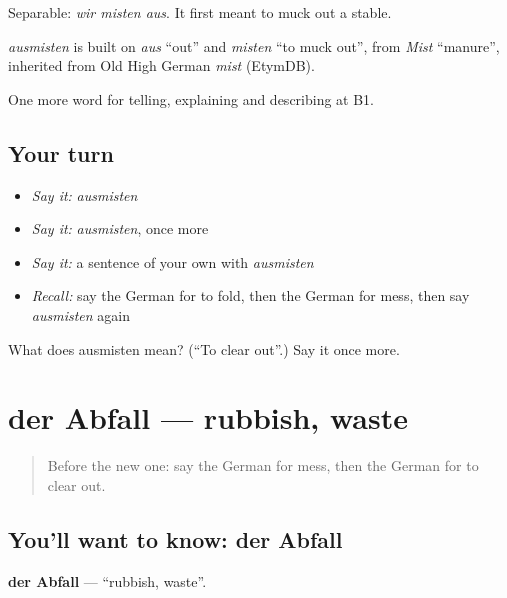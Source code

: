 Separable: \emph{wir misten aus}. It first meant to muck out a stable.

\begin{cousinweb}
\emph{ausmisten} is built on \emph{aus} \textquotedblleft{}out\textquotedblright{} and \emph{misten} \textquotedblleft{}to muck out\textquotedblright{}, from \emph{Mist} \textquotedblleft{}manure\textquotedblright{}, inherited from Old High German \emph{mist} (EtymDB).
\end{cousinweb}

\begin{grammarlens}[title={What you've built}]
One more word for telling, explaining and describing at B1.
\end{grammarlens}

\subsection*{Your turn}
\begin{itemize}
\raggedright
  \item \emph{Say it:} \emph{ausmisten}
  \item \emph{Say it:} \emph{ausmisten}, once more
  \item \emph{Say it:} a sentence of your own with \emph{ausmisten}
  \item \emph{Recall:} say the German for to fold, then the German for mess, then say \emph{ausmisten} again
\end{itemize}

\begin{tcolorbox}[breakable,colback=teal!4,colframe=teal!35!black,title={Before you move on}]
What does ausmisten mean? (\textquotedblleft{}To clear out\textquotedblright{}.) Say it once more.
\end{tcolorbox}
\section[der Abfall]{der Abfall — rubbish, waste}

\label{lesson:GE-C528-abfall}



\begin{quote}
Before the new one: say the German for mess, then the German for to clear out.
\end{quote}

\subsection*{You'll want to know: der Abfall}
\textbf{der Abfall} — \textquotedblleft{}rubbish, waste\textquotedblright{}.

